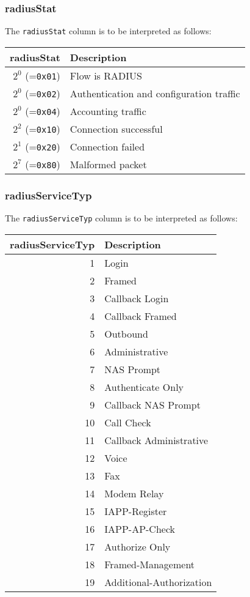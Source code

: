 \documentclass[documentation]{subfiles}
\begin{document}
\subsubsection{radiusStat}\label{radiusStat}
The {\tt radiusStat} column is to be interpreted as follows:
\begin{longtable}{rl}
    \toprule
    {\bf radiusStat} & {\bf Description}\\
    \midrule\endhead%
    $2^0$ (={\tt 0x01}) & Flow is RADIUS\\
    $2^0$ (={\tt 0x02}) & Authentication and configuration traffic\\
    $2^0$ (={\tt 0x04}) & Accounting traffic\\
    $2^2$ (={\tt 0x10}) & Connection successful\\
    $2^1$ (={\tt 0x20}) & Connection failed\\
    $2^7$ (={\tt 0x80}) & Malformed packet\\
    \bottomrule
\end{longtable}

\subsubsection{radiusServiceTyp}\label{radiusServiceTyp}
The {\tt radiusServiceTyp} column is to be interpreted as follows:
\begin{longtable}{rl}
    \toprule
    {\bf radiusServiceTyp} & {\bf Description}\\
    \midrule\endhead%
     1 & Login\\
     2 & Framed\\
     3 & Callback Login\\
     4 & Callback Framed\\
     5 & Outbound\\
     6 & Administrative\\
     7 & NAS Prompt\\
     8 & Authenticate Only\\
     9 & Callback NAS Prompt\\
    10 & Call Check\\
    11 & Callback Administrative\\
    12 & Voice\\
    13 & Fax\\
    14 & Modem Relay\\
    15 & IAPP-Register\\
    16 & IAPP-AP-Check\\
    17 & Authorize Only\\
    18 & Framed-Management\\
    19 & Additional-Authorization\\
    \bottomrule
\end{longtable}
\end{document}
